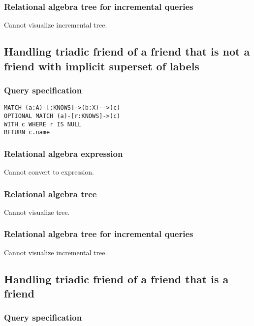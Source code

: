 \subsubsection*{Relational algebra tree for incremental queries}

Cannot visualize incremental tree.

\subsection{Handling triadic friend of a friend that is not a friend with implicit superset of labels}

\subsubsection*{Query specification}

\begin{lstlisting}
MATCH (a:A)-[:KNOWS]->(b:X)-->(c)
OPTIONAL MATCH (a)-[r:KNOWS]->(c)
WITH c WHERE r IS NULL
RETURN c.name
\end{lstlisting}

\subsubsection*{Relational algebra expression}

Cannot convert to expression.

\subsubsection*{Relational algebra tree}

Cannot visualize tree.

\subsubsection*{Relational algebra tree for incremental queries}

Cannot visualize incremental tree.

\subsection{Handling triadic friend of a friend that is a friend}

\subsubsection*{Query specification}

